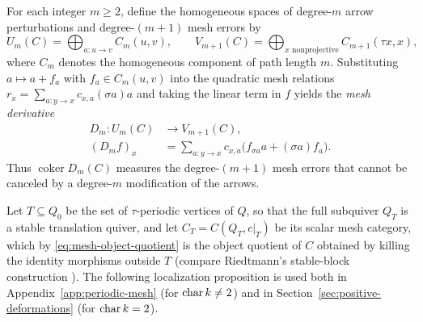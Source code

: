 For each integer $m\geq2$, define the homogeneous spaces of degree-$m$ arrow
perturbations and degree-$(m+1)$ mesh errors by
\[
 U_m(C)=\bigoplus_{a:u\to v}C_m(u,v),\qquad
 V_{m+1}(C)=\bigoplus_{x\text{ nonprojective}}C_{m+1}(\tau x,x),
\]
where $C_m$ denotes the homogeneous component of path length $m$. Substituting
$a\mapsto a+f_a$ with $f_a\in C_m(u,v)$ into the quadratic mesh relations
$r_x=\sum_{a:y\to x}c_{x,a}(\sigma a)a$ and taking the linear term in $f$
yields the \emph{mesh derivative}
\begin{equation}
 \begin{split}
 D_m:U_m(C)&\longrightarrow V_{m+1}(C),\\
 (D_mf)_x&=\sum_{a:y\to x}c_{x,a}
             \bigl(f_{\sigma a}a+(\sigma a)f_a\bigr).
 \end{split}
 \label{eq:mesh-derivative}
\end{equation}
Thus $\operatorname{coker}D_m(C)$ measures the degree-$(m+1)$ mesh errors
that cannot be canceled by a degree-$m$ modification of the arrows.

Let $T\subseteq Q_0$ be the set of $\tau$-periodic vertices of $Q$, so that
the full subquiver $Q_T$ is a stable translation quiver, and let
$C_T=C(Q_T,c|_T)$ be its scalar mesh category, which by
\eqref{eq:mesh-object-quotient} is the object quotient of $C$ obtained by
killing the identity morphisms outside $T$ (compare Riedtmann's stable-block
construction \cite{Riedtmann1984}). The following localization proposition is
used both in Appendix~\ref{app:periodic-mesh} (for $\operatorname{char} k\ne2$) and in
Section~\ref{sec:positive-deformations} (for $\operatorname{char} k=2$).

